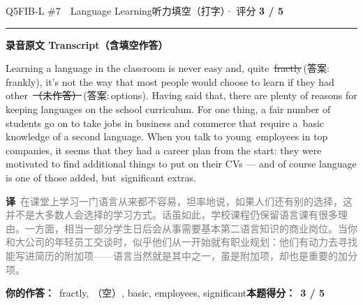 \documentclass[11pt]{article}
\newcommand{\ptesub}[1]{%
  \par\needspace{2\baselineskip}\smallskip
  {\color{cAccent}\rule[-0.2ex]{3pt}{1.05em}}\hspace{6pt}%
  {\bfseries\color{cHead}#1}\par\nopagebreak\smallskip}
\newcommand{\zh}[1]{{\footnotesize\textcolor{cNote}{\textbf{译}}\ \textcolor{gray}{#1}}}
\newcommand{\rok}[1]{{\color{cFix}\ding{51}\,#1}}                 %
\newcommand{\rno}[2]{{\color{cWrong}\ding{55}\,\sout{#1}}\,{\footnotesize\color{cFix}(答案:\,#2)}}  %
\begin{document}
\begin{qblock}{Q5\quad FIB-L \#7\ \ Language Learning}{听力填空（打字）· 评分 \textcolor{cAccent}{\bfseries 3 / 5}}
\ptesub{录音原文 Transcript（含填空作答）}
\begin{promptbox}
Learning a language in the classroom is never easy and, quite \rno{fractly}{frankly}, it's not the way that most people would choose to learn if they had other \rno{（未作答）}{options}. Having said that, there are plenty of reasons for keeping languages on the school curriculum. For one thing, a fair number of students go on to take jobs in business and commerce that require a \rok{basic} knowledge of a second language. When you talk to young \rok{employees} in top companies, it seems that they had a career plan from the start: they were motivated to find additional things to put on their CVs --- and of course language is one of those added, but \rok{significant} extras.
\end{promptbox}
\zh{在课堂上学习一门语言从来都不容易，坦率地说，如果人们还有别的选择，这并不是大多数人会选择的学习方式。话虽如此，学校课程仍保留语言课有很多理由。一方面，相当一部分学生日后会从事需要基本第二语言知识的商业岗位。当你和大公司的年轻员工交谈时，似乎他们从一开始就有职业规划：他们有动力去寻找能写进简历的附加项——语言当然就是其中之一，虽是附加项，却也是重要的加分项。}
\par\smallskip
\textbf{你的作答：}\ {\color{cWrong}fractly}, {\color{cWrong}（空）}, basic, employees, significant\qquad\textbf{本题得分：}\ {\color{cAccent}\bfseries 3 / 5}
\end{qblock}
\end{document}
